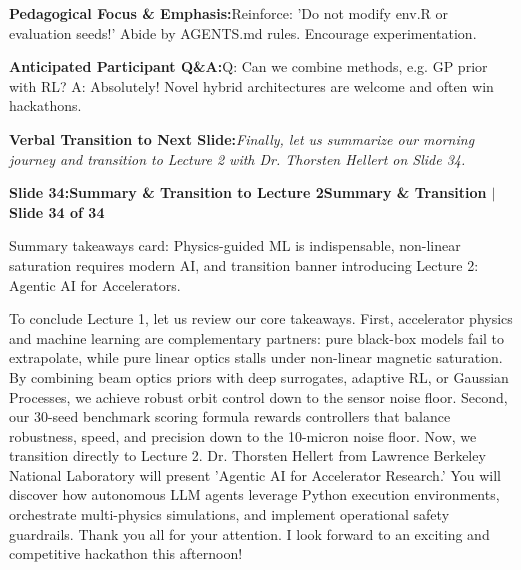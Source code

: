 \documentclass[11pt,a4paper]{article}
\begin{document}
\begin{tcolorbox}[colback=lightbg,colframe=bordergray,left=6pt,right=6pt,top=3pt,bottom=3pt,boxrule=0.6pt,arc=2.5pt]
\small
\noindent\textbf{\color{navy}Pedagogical Focus \& Emphasis:}\enspace Reinforce: 'Do not modify env.R or evaluation seeds!' Abide by AGENTS.md rules. Encourage experimentation.\par\vspace{0.3em}
\noindent\textbf{\color{successgreen}Anticipated Participant Q\&A:}\enspace Q: Can we combine methods, e.g. GP prior with RL? A: Absolutely! Novel hybrid architectures are welcome and often win hackathons.\par\vspace{0.3em}
\noindent\textbf{\color{accent}Verbal Transition to Next Slide:}\enspace \emph{Finally, let us summarize our morning journey and transition to Lecture 2 with Dr. Thorsten Hellert on Slide 34.}
\end{tcolorbox}
\clearpage
\hypertarget{slide.34}{}
{}
\noindent\begin{tcolorbox}[colback=navy,colframe=navy,left=6pt,right=6pt,top=3pt,bottom=3pt,boxrule=0pt,arc=2pt]
{\large\bfseries\color{white}Slide 34:\enspace Summary \& Transition to Lecture 2}\hfill{\footnotesize\bfseries\color{white!85!lightbg}Summary \& Transition \enspace$|$\enspace Slide 34 of 34}
\end{tcolorbox}
\vspace{0.2em}
\begin{tcolorbox}[colback=lightbg,colframe=bordergray,title={\footnotesize\bfseries\color{darkgray}Slide Visual Blueprint},fontupper=\small,left=6pt,right=6pt,top=2.5pt,bottom=2.5pt,boxrule=0.6pt,arc=2.5pt]
Summary takeaways card: Physics-guided ML is indispensable, non-linear saturation requires modern AI, and transition banner introducing Lecture 2: Agentic AI for Accelerators.
\end{tcolorbox}
\vspace{0.2em}
\begin{tcolorbox}[colback=white,colframe=primaryblue,title={\footnotesize\bfseries\color{white}Spoken Presenter Script},fontupper=\small,left=6pt,right=6pt,top=3pt,bottom=3pt,boxrule=0.8pt,arc=2.5pt]
To conclude Lecture 1, let us review our core takeaways. First, accelerator physics and machine learning are complementary partners: pure black-box models fail to extrapolate, while pure linear optics stalls under non-linear magnetic saturation. By combining beam optics priors with deep surrogates, adaptive RL, or Gaussian Processes, we achieve robust orbit control down to the sensor noise floor. Second, our 30-seed benchmark scoring formula rewards controllers that balance robustness, speed, and precision down to the 10-micron noise floor. Now, we transition directly to Lecture 2. Dr. Thorsten Hellert from Lawrence Berkeley National Laboratory will present 'Agentic AI for Accelerator Research.' You will discover how autonomous LLM agents leverage Python execution environments, orchestrate multi-physics simulations, and implement operational safety guardrails. Thank you all for your attention. I look forward to an exciting and competitive hackathon this afternoon!
\end{tcolorbox}
\end{document}
